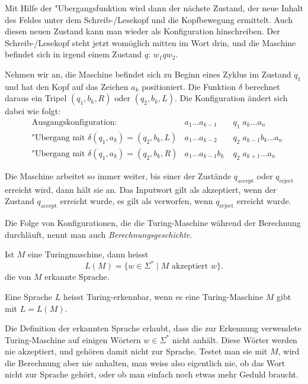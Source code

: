 Mit Hilfe der "Ubergangsfunktion wird dann der nächste Zustand,
der neue Inhalt des Feldes unter dem Schreib-/Lesekopf und die
Kopfbewegung ermittelt. Auch diesen neuen Zustand kann man wieder
als Konfiguration hinschreiben. Der Schreib-/Lesekopf steht
jetzt womöglich mitten im Wort drin, und die Maschine befindet
sich in irgend einem Zustand $q$: $w_1qw_2$.

Nehmen wir an, die Maschine befindet sich zu Beginn eines Zyklus im
Zustand $q_1$ und hat den Kopf auf das Zeichen $a_k$ positioniert.
Die Funktion $\delta$ berechnet daraus ein Tripel $(q_1,b_k,R)$
oder $(q_2,b_k,L)$. Die Konfiguration ändert sich dabei wie
folgt:
\begin{align*}
&\text{Ausgangskonfiguration:}&a_1\dots a_{k-1}&\;q_1\;a_k\dots a_n\\
&\text{"Ubergang mit } \delta(q_1,a_k)=(q_2,b_k,L)&a_1\dots a_{k-2}&\;q_2\;a_{k-1}b_k\dots a_n\\
&\text{"Ubergang mit } \delta(q_1,a_k)=(q_2,b_k,R)&a_1\dots a_{k-1}b_k&\;q_2\;a_{k+1}\dots a_n
\end{align*}

Die Maschine arbeitet so immer weiter, bis einer der Zustände $q_{\text{accept}}$
oder $q_{\text{reject}}$ erreicht wird, dann hält sie an.
Das Inputwort gilt als akzeptiert, wenn der Zustand $q_{\text{accept}}$
erreicht wurde, es gilt als verworfen, wenn $q_{\text{reject}}$ erreicht
wurde.

Die Folge von Konfigurationen, die die Turing-Maschine
während der Berechnung durchläuft, nennt man auch
{\em Berechnungsgeschichte}.

\begin{definition}
Ist $M$ eine Turingmaschine, dann heisst
\[
L(M)=\{w\in\Sigma^*\;|\;\text{$M$ akzeptiert $w$}\}.
\]
die von $M$ erkannte Sprache.
\end{definition}

\begin{definition}
Eine Sprache $L$ heisst Turing-erkennbar, wenn es eine Turing-Maschine
$M$ gibt mit $L=L(M)$.
\end{definition}

Die Definition der erkannten Sprache erlaubt, dass die zur Erkennung
verwendete Turing-Maschine auf einigen Wörtern $w\in\Sigma^*$ nicht
anhält. Diese Wörter werden nie akzeptiert, und gehören
damit nicht zur Sprache. Testet man sie mit $M$, wird die Berechnung
aber nie anhalten, man weiss also eigentlich nie, ob das Wort
nicht zur Sprache gehört, oder ob man einfach noch etwas mehr
Geduld braucht.

